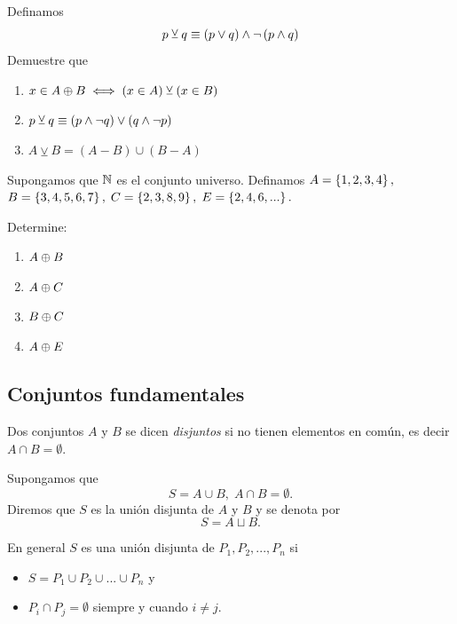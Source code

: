 \begin{exmp}
Definamos $$p\veebar q \equiv \left( p \vee q \right) \wedge \neg\left( p \wedge q \right)$$
Demuestre que 
\begin{enumerate}
\item $ \displaystyle
x \in A\oplus B \iff \left( x \in A \right) \veebar \left( x \in B  \right)
$ 
\item $\displaystyle p\veebar q \equiv \left( p \wedge \neg q \right) \vee \left( q \wedge \neg p \right)$ 
\item $\displaystyle A \veebar B = \left( A \minus B \right) \cup \left( B \minus A \right)$
\end{enumerate}

\end{exmp}




\begin{exmp}
\label{lip:exmp:1.5}
Supongamos que $\mathbb{N}$ es el conjunto universo. Definamos $A=\left\{ 1,2,3,4 \right\},$ $B=\left\{ 3,4,5,6,7 \right\},$ $C=\left\{ 2,3,8,9 \right\},$ $E=\left\{ 2,4,6,... \right\}.$

Determine:
\begin{enumerate}
\item $A \oplus B$ 
\item $A \oplus C$ 
\item $B \oplus C$ 
\item $A \oplus E$
\end{enumerate}
\end{exmp}



\subsection{Conjuntos fundamentales}


Dos conjuntos $A$ y $B$ se dicen \emph{disjuntos} si no tienen elementos en com\'un, es decir $A\cap B=\emptyset$.


Supongamos que 
$$
S=A\cup B, \; A\cap B=\emptyset.
$$  Diremos que $S$ es la uni\'on disjunta de $A$ y $B$ y se denota por $$S=A \sqcup B.$$ 




En general $S$ es una uni\'on disjunta de $P_{1}, P_{2},...,P_{n}$ si 
\begin{itemize}
\item $\displaystyle S=P_{1}\cup P_{2}\cup...\cup P_{n}$ y
\item $P_{i}\cap P_{j}=\emptyset$ siempre y cuando $i\neq j.$
\end{itemize}


